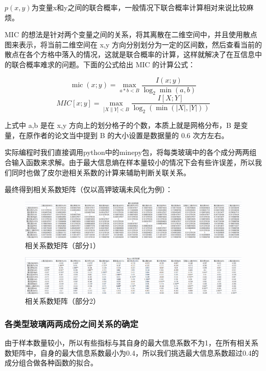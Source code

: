 \documentclass{my_paper}
\begin{document}
$p(x,y)$为变量x和y之间的联合概率，一般情况下联合概率计算相对来说比较麻烦。

MIC \cite{14}的想法是针对两个变量之间的关系，将其离散在二维空间中，并且使用散点图来表示，将当前二维空间在 x,y 方向分别划分为一定的区间数，然后查看当前的散点在各个方格中落入的情况，这就是联合概率的计算，这样就解决了在互信息中的联合概率难求的问题。下面的公式给出 MIC 的计算公式：

$$\operatorname{mic}(x ; y)=\max _{a * b<B} \frac{I(x ; y)}{\log _{2} \min (a, b)}$$
$$M I C[x ; y]=\max _{|X \| Y|<B} \frac{I[X ; Y]}{\log _{2}(\min (|X|,|Y|))}$$

上式中 a,b 是在 x,y 方向上的划分格子的个数，本质上就是网格分布，B 是变量，在原作者的论文当中提到 B 的大小设置是数据量的 0.6 次方左右。

实际编程时我们直接调用python中的minepy包，将每类玻璃中的各个成分两两组合输入函数来求解。由于最大信息熵在样本量较小的情况下会有些许误差，所以我们同时也做了皮尔逊相关系数的计算来辅助判断关联关系。

最终得到相关系数矩阵（仅以高钾玻璃未风化为例）：

\begin {figure}[h]
\centering %
\includegraphics[width=\textwidth]{st1.png}
\caption{相关系数矩阵（部分1）} %
\label{five}
\end {figure}
\begin {figure}[h]
\centering %
\includegraphics[width=\textwidth]{st2.png}
\caption{相关系数矩阵（部分2）} %
\label{five}
\end {figure}

\subsubsection{各类型玻璃两两成份之间关系的确定}

由于样本数量较小，所以有些指标与其自身的最大信息系数不为1，在所有相关系数矩阵中，自身的最大信息系数最小为0.4，所以我们挑选最大信息系数超过0.4的成分组合做各种函数的拟合。
\end{document}

